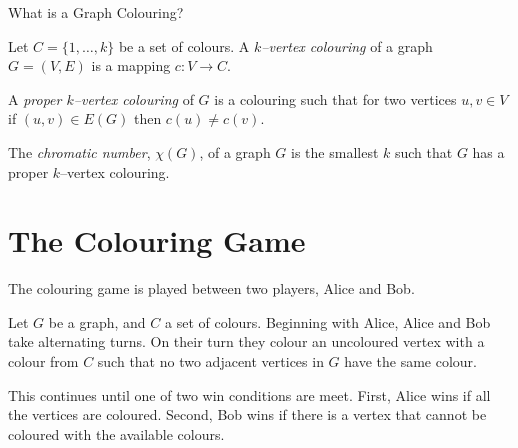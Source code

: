 \documentclass[handout]{beamer}
\begin{document}

\begin{frame}{\secname}{What is a Graph Colouring?}
    
    Let $C=\{1,\dots,k\}$ be a set of colours. A \textit{$k$--vertex colouring} of a graph $G=(V,E)$ is a mapping $c\colon V \to C$. 
    
    \bigskip
    
    A \textit{proper $k$--vertex colouring} of $G$ is a colouring such that for two vertices $u,v\in V$ if $(u,v)\in E(G)$ then $c(u)\neq c(v)$.
    
    \bigskip
    
    The \textit{chromatic number}, $\chi(G)$, of a graph $G$ is the smallest $k$ such that $G$ has a proper $k$--vertex colouring.
\end{frame}


\section{The Colouring Game}


\begin{frame}{\secname} 
        
        
    
    The colouring game is played between two players, Alice and Bob.
    
    \bigskip
    
    Let $G$ be a graph, and $C$ a set of colours. Beginning with Alice, Alice and Bob take alternating turns. On their turn they colour an uncoloured vertex with a colour from $C$ such that no two adjacent vertices in $G$ have the same colour. 
    
    \bigskip
    
    This continues until one of two win conditions are meet. First, Alice wins if all the vertices are coloured. Second, Bob wins if there is a vertex that cannot be coloured with the available colours.
\end{frame}

\end{document}
